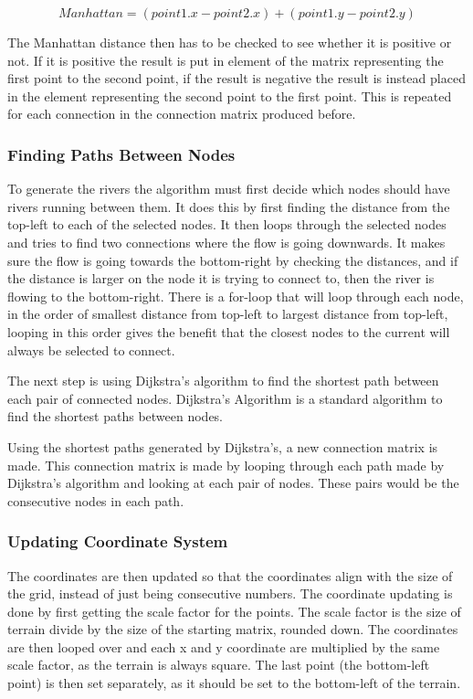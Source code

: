	$$Manhattan = (point1.x - point2.x) + (point1.y - point2.y)$$
	
	The Manhattan distance then has to be checked to see whether it is positive or not. If it is positive the result is put in element of the matrix representing the first point to the second point, if the result is negative the result is instead placed in the element representing the second point to the first point. This is repeated for each connection in the connection matrix produced before.

\subsubsection{Finding Paths Between Nodes}
	To generate the rivers the algorithm must first decide which nodes should have rivers running between them. It does this by first finding the distance from the top-left to each of the selected nodes. It then loops through the selected nodes and tries to find two connections where the flow is going downwards. It makes sure the flow is going towards the bottom-right by checking the distances, and if the distance is larger on the node it is trying to connect to, then the river is flowing to the bottom-right. There is a for-loop that will loop through each node, in the order of smallest distance from top-left to largest distance from top-left, looping in this order gives the benefit that the closest nodes to the current will always be selected to connect.


	The next step is using Dijkstra's algorithm to find the shortest path between each pair of connected nodes. Dijkstra's Algorithm is a standard algorithm to find the shortest paths between nodes.
	\newline
	\par

	Using the shortest paths generated by Dijkstra's, a new connection matrix is made. This connection matrix is made by looping through each path made by Dijkstra's algorithm and looking at each pair of nodes. These pairs would be the consecutive nodes in each path.
	\newline
	\par
	
\subsubsection{Updating Coordinate System}
	The coordinates are then updated so that the coordinates align with the size of the grid, instead of just being consecutive numbers. The coordinate updating is done by first getting the scale factor for the points. The scale factor is the size of terrain divide by the size of the starting matrix, rounded down. The coordinates are then looped over and each x and y coordinate are multiplied by the same scale factor, as the terrain is always square. The last point (the bottom-left point) is then set separately, as it should be set to the bottom-left of the terrain. 
	\newline
	\par
	
